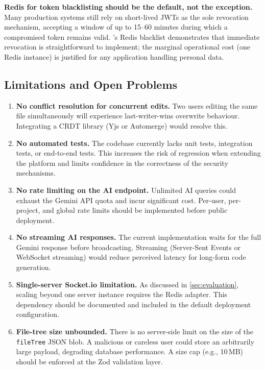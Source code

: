 \textbf{Redis for token blacklisting should be the default, not the exception.}
Many production systems still rely on short-lived JWTs as the sole revocation
mechanism, accepting a window of up to 15--60 minutes during which a
compromised token remains valid. \echoray{}'s Redis blacklist demonstrates
that immediate revocation is straightforward to implement; the marginal
operational cost (one Redis instance) is justified for any application handling
personal data.

\subsection{Limitations and Open Problems}

\begin{enumerate}[leftmargin=*, label=\textbf{L\arabic*.}]
  \item \textbf{No conflict resolution for concurrent edits.}
    Two users editing the same file simultaneously will experience
    last-writer-wins overwrite behaviour. Integrating a CRDT library (Yjs or
    Automerge) would resolve this.

  \item \textbf{No automated tests.}
    The codebase currently lacks unit tests, integration tests, or end-to-end
    tests. This increases the risk of regression when extending the platform
    and limits confidence in the correctness of the security mechanisms.

  \item \textbf{No rate limiting on the AI endpoint.}
    Unlimited AI queries could exhaust the Gemini API quota and incur
    significant cost. Per-user, per-project, and global rate limits should
    be implemented before public deployment.

  \item \textbf{No streaming AI responses.}
    The current implementation waits for the full Gemini response before
    broadcasting. Streaming (Server-Sent Events or WebSocket streaming) would
    reduce perceived latency for long-form code generation.

  \item \textbf{Single-server Socket.io limitation.}
    As discussed in \cref{sec:evaluation}, scaling beyond one server instance
    requires the Redis adapter. This dependency should be documented and
    included in the default deployment configuration.

  \item \textbf{File-tree size unbounded.}
    There is no server-side limit on the size of the \texttt{fileTree} JSON
    blob. A malicious or careless user could store an arbitrarily large payload,
    degrading database performance. A size cap (e.g., 10\,MB) should be
    enforced at the Zod validation layer.
\end{enumerate}
